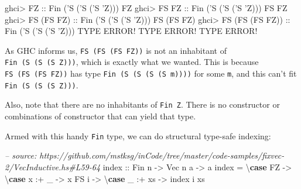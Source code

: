 \documentclass[]{article}
\newenvironment{Shaded}{}{}
\newcommand{\KeywordTok}[1]{\textcolor[rgb]{0.00,0.44,0.13}{\textbf{#1}}}
\newcommand{\DataTypeTok}[1]{\textcolor[rgb]{0.56,0.13,0.00}{#1}}
\newcommand{\CharTok}[1]{\textcolor[rgb]{0.25,0.44,0.63}{#1}}
\newcommand{\CommentTok}[1]{\textcolor[rgb]{0.38,0.63,0.69}{\textit{#1}}}
\newcommand{\OtherTok}[1]{\textcolor[rgb]{0.00,0.44,0.13}{#1}}
\newcommand{\FunctionTok}[1]{\textcolor[rgb]{0.02,0.16,0.49}{#1}}
\newcommand{\NormalTok}[1]{#1}
\begin{document}
\begin{Shaded}
\begin{Highlighting}[]
\NormalTok{ghci}\FunctionTok{>} \DataTypeTok{FZ}\OtherTok{              ::} \DataTypeTok{Fin}\NormalTok{ (}\CharTok{'S ('}\DataTypeTok{S}\NormalTok{ (}\CharTok{'S '}\DataTypeTok{Z}\NormalTok{)))}
\DataTypeTok{FZ}
\NormalTok{ghci}\FunctionTok{>} \DataTypeTok{FS} \DataTypeTok{FZ}\OtherTok{           ::} \DataTypeTok{Fin}\NormalTok{ (}\CharTok{'S ('}\DataTypeTok{S}\NormalTok{ (}\CharTok{'S '}\DataTypeTok{Z}\NormalTok{)))}
\DataTypeTok{FS} \DataTypeTok{FZ}
\NormalTok{ghci}\FunctionTok{>} \DataTypeTok{FS}\NormalTok{ (}\DataTypeTok{FS} \DataTypeTok{FZ}\NormalTok{)}\OtherTok{      ::} \DataTypeTok{Fin}\NormalTok{ (}\CharTok{'S ('}\DataTypeTok{S}\NormalTok{ (}\CharTok{'S '}\DataTypeTok{Z}\NormalTok{)))}
\DataTypeTok{FS}\NormalTok{ (}\DataTypeTok{FS} \DataTypeTok{FZ}\NormalTok{)}
\NormalTok{ghci}\FunctionTok{>} \DataTypeTok{FS}\NormalTok{ (}\DataTypeTok{FS}\NormalTok{ (}\DataTypeTok{FS} \DataTypeTok{FZ}\NormalTok{))}\OtherTok{ ::} \DataTypeTok{Fin}\NormalTok{ (}\CharTok{'S ('}\DataTypeTok{S}\NormalTok{ (}\CharTok{'S '}\DataTypeTok{Z}\NormalTok{)))}
\DataTypeTok{TYPE} \DataTypeTok{ERROR}\FunctionTok{!}  \DataTypeTok{TYPE} \DataTypeTok{ERROR}\FunctionTok{!}  \DataTypeTok{TYPE} \DataTypeTok{ERROR}\FunctionTok{!}
\end{Highlighting}
\end{Shaded}

As GHC informs us, \texttt{FS\ (FS\ (FS\ FZ))} is not an inhabitant of
\texttt{Fin\ (\textquotesingle{}S\ (\textquotesingle{}S\ (\textquotesingle{}S\ \textquotesingle{}Z)))},
which is exactly what we wanted. This is because \texttt{FS\ (FS\ (FS\ FZ))} has
type
\texttt{Fin\ (\textquotesingle{}S\ (\textquotesingle{}S\ (\textquotesingle{}S\ (\textquotesingle{}S\ m))))}
for some \texttt{m}, and this can't fit
\texttt{Fin\ (\textquotesingle{}S\ (\textquotesingle{}S\ (\textquotesingle{}S\ \textquotesingle{}Z)))}.

Also, note that there are no inhabitants of \texttt{Fin\ \textquotesingle{}Z}.
There is no constructor or combinations of constructor that can yield that type.

Armed with this handy \texttt{Fin} type, we can do structural type-safe
indexing:

\begin{Shaded}
\begin{Highlighting}[]
\CommentTok{-- source: https://github.com/mstksg/inCode/tree/master/code-samples/fixvec-2/VecInductive.hs#L59-64}
\NormalTok{index}\OtherTok{ ::} \DataTypeTok{Fin}\NormalTok{ n }\OtherTok{->} \DataTypeTok{Vec}\NormalTok{ n a }\OtherTok{->}\NormalTok{ a}
\NormalTok{index }\FunctionTok{=}\NormalTok{ \textbackslash{}}\KeywordTok{case}
    \DataTypeTok{FZ} \OtherTok{->}\NormalTok{ \textbackslash{}}\KeywordTok{case}
\NormalTok{      x }\FunctionTok{:+}\NormalTok{ _ }\OtherTok{->}\NormalTok{ x}
    \DataTypeTok{FS}\NormalTok{ i }\OtherTok{->}\NormalTok{ \textbackslash{}}\KeywordTok{case}
\NormalTok{      _ }\FunctionTok{:+}\NormalTok{ xs }\OtherTok{->}\NormalTok{ index i xs}
\end{Highlighting}
\end{Shaded}
\end{document}
